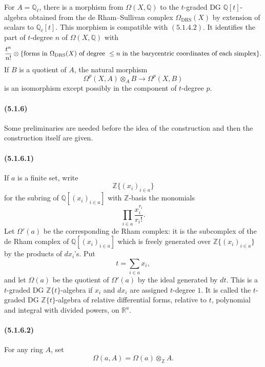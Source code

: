 \documentclass[11pt]{article}
\theoremstyle{remark}
\newcommand{\Ql}{\mathbb{Q}_\ell}
\newcommand{\ZZ}{\mathbb{Z}}
\newcommand{\QQ}{\mathbb{Q}}
\newcommand{\RR}{\mathbb{R}}
\begin{document}
For \(A=\QQ_\ell\), there is a morphism from \(\Omega(X,\QQ)\) to the \(t\)-graded DG \(\QQ[t]\)-algebra obtained from the de Rham--Sullivan complex \(\Omega_{\mathrm{DRS}}(X)\) by extension of scalars to \(\Ql[t]\).  This morphism is compatible with \((5.1.4.2)\).  It identifies the part of \(t\)-degree \(n\) of \(\Omega(X,\QQ)\) with
\[
\frac{t^n}{n!}\otimes
\{\hbox{forms in }\Omega_{\mathrm{DRS}}(X)\hbox{ of degree }\le n
\hbox{ in the barycentric coordinates of each simplex}\}.
\]
If \(B\) is a quotient of \(A\), the natural morphism
\[
\Omega^p(X,A)\otimes_A B\longrightarrow \Omega^p(X,B)
\]
is an isomorphism except possibly in the component of \(t\)-degree \(p\).

\paragraph{(5.1.6)}
Some preliminaries are needed before the idea of the construction and then the construction itself are given.

\paragraph{(5.1.6.1)}
If \(a\) is a finite set, write
\[
\ZZ\{(x_i)_{i\in a}\}
\]
for the subring of \(\QQ[(x_i)_{i\in a}]\) with \(\ZZ\)-basis the monomials
\[
\prod_{i\in a}\frac{x_i^{r_i}}{r_i!}.
\]
Let \(\Omega'(a)\) be the corresponding de Rham complex: it is the subcomplex of the de Rham complex of \(\QQ[(x_i)_{i\in a}]\) which is freely generated over \(\ZZ\{(x_i)_{i\in a}\}\) by the products of \(dx_i\)'s.  Put
\[
t=\sum_{i\in a}x_i,
\]
and let \(\Omega(a)\) be the quotient of \(\Omega'(a)\) by the ideal generated by \(dt\).  This is a \(t\)-graded DG \(\ZZ\{t\}\)-algebra if \(x_i\) and \(dx_i\) are assigned \(t\)-degree \(1\).  It is called the \(t\)-graded DG \(\ZZ\{t\}\)-algebra of relative differential forms, relative to \(t\), polynomial and integral with divided powers, on \(\RR^a\).

\paragraph{(5.1.6.2)}
For any ring \(A\), set
\[
\Omega(a,A)=\Omega(a)\otimes_{\ZZ}A.
\]
\end{document}
